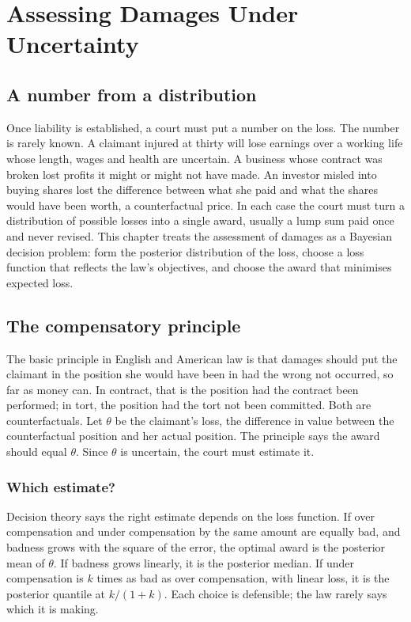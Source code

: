 \chapter{Assessing Damages Under Uncertainty}
\label{ch:damages}

\section{A number from a distribution}

Once liability is established, a court must put a number on the loss. The number is rarely known. A claimant injured at thirty will lose earnings over a working life whose length, wages and health are uncertain. A business whose contract was broken lost profits it might or might not have made. An investor misled into buying shares lost the difference between what she paid and what the shares would have been worth, a counterfactual price. In each case the court must turn a distribution of possible losses into a single award, usually a lump sum paid once and never revised. This chapter treats the assessment of damages as a Bayesian decision problem: form the posterior distribution of the loss, choose a loss function that reflects the law's objectives, and choose the award that minimises expected loss.

\section{The compensatory principle}

The basic principle in English and American law is that damages should put the claimant in the position she would have been in had the wrong not occurred, so far as money can. In contract, that is the position had the contract been performed; in tort, the position had the tort not been committed. Both are counterfactuals. Let $\theta$ be the claimant's loss, the difference in value between the counterfactual position and her actual position. The principle says the award should equal $\theta$. Since $\theta$ is uncertain, the court must estimate it.

\subsection{Which estimate?}

Decision theory says the right estimate depends on the loss function. If over compensation and under compensation by the same amount are equally bad, and badness grows with the square of the error, the optimal award is the posterior mean of $\theta$. If badness grows linearly, it is the posterior median. If under compensation is $k$ times as bad as over compensation, with linear loss, it is the posterior quantile at $k/(1+k)$. Each choice is defensible; the law rarely says which it is making.


